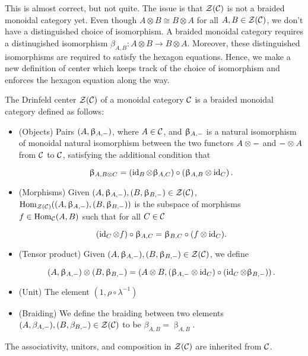 This is almost correct, but not quite. The issue is that ${\mathcal Z}({\mathcal C})$ is not a braided monoidal category yet. Even though $A\otimes B\cong B\otimes A$ for all $A,B\in {\mathcal Z}({\mathcal C})$, we don't have a distinguished choice of isomorphism. A braided monoidal category requires a distinugished isomorphism $\beta_{A,B}:A\otimes B\xrightarrow{} B\otimes A$. Moreover, these distinguished isomorphisms are required to satisfy the hexagon equations. Hence, we make a new definition of center which keeps track of the choice of isomorphism and enforces the hexagon equation along the way.


\begin{defn} The Drinfeld center ${\mathcal Z}({\mathcal C})$ of a monoidal category ${\mathcal C}$ is a braided monoidal category defined as follows:

\begin{itemize}
\item (Objects) Pairs $(A,\upbeta_{A,\--})$, where $A\in {\mathcal C}$, and $\upbeta_{A,\--}$ is a natural isomorphism of monoidal natural isomorphism between the two functors $A\otimes \--$ and $\--\otimes A$ from ${\mathcal C}$ to ${\mathcal C}$, satisfying the additional condition that

$$\upbeta_{A,B\otimes C}=\left(\operatorname{id}_{B}\otimes \upbeta_{A,C}\right)\circ \left(\upbeta_{A,B}\otimes \operatorname{id}_C\right).$$

\item (Morphisms) Given $(A,\upbeta_{A,\--}), (B,\upbeta_{B,\--})\in {\mathcal Z}({\mathcal C})$, $\operatorname{Hom}_{{\mathcal Z}({\mathcal C})}((A,\upbeta_{A,\--}),(B,\upbeta_{B,\--}))$ is the subspace of morphisms $f\in \operatorname{Hom}_{{\mathcal C}}(A,B)$ such that for all $C\in {\mathcal C}$

$$\left(\operatorname{id}_{C}\otimes f\right)\circ \upbeta_{A,C}=\upbeta_{B,C}\circ (f\otimes \operatorname{id}_C).$$

\item (Tensor product) Given $(A,\upbeta_{A,\--}), (B,\upbeta_{B,\--})\in {\mathcal Z}({\mathcal C})$, we define

$$(A,\upbeta_{A,\--})\otimes (B,\upbeta_{B,\--})=\left(A\otimes B, (\upbeta_{A,\--}\otimes \operatorname{id}_{C})\circ (\operatorname{id}_{C}\otimes \upbeta_{B,\--}) \right).$$

\item (Unit) The element $(1,\rho\circ \lambda^{-1})$

\item (Braiding) We define the braiding between two elements $(A,\beta_{A,\--}), (B,\beta_{B,\--})\in {\mathcal Z}({\mathcal C})$ to be $\beta_{A,B}=\upbeta_{A,B}$.
\end{itemize}

The associativity, unitors, and composition in ${\mathcal Z}({\mathcal C})$ are inherited from ${\mathcal C}$.
\end{defn}

